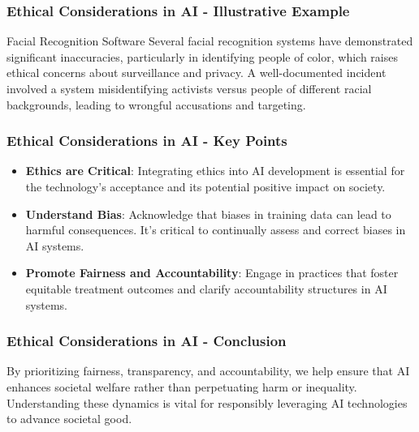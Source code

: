 \documentclass[aspectratio=169]{beamer}
\begin{document}
\begin{frame}[fragile]
    \frametitle{Ethical Considerations in AI - Illustrative Example}
    \begin{block}{Facial Recognition Software}
        Several facial recognition systems have demonstrated significant inaccuracies, particularly in identifying people of color, which raises ethical concerns about surveillance and privacy. 
        A well-documented incident involved a system misidentifying activists versus people of different racial backgrounds, leading to wrongful accusations and targeting.
    \end{block}
\end{frame}

\begin{frame}[fragile]
    \frametitle{Ethical Considerations in AI - Key Points}
    \begin{itemize}
        \item \textbf{Ethics are Critical}: Integrating ethics into AI development is essential for the technology's acceptance and its potential positive impact on society.
        \item \textbf{Understand Bias}: Acknowledge that biases in training data can lead to harmful consequences. It's critical to continually assess and correct biases in AI systems.
        \item \textbf{Promote Fairness and Accountability}: Engage in practices that foster equitable treatment outcomes and clarify accountability structures in AI systems.
    \end{itemize}
\end{frame}

\begin{frame}[fragile]
    \frametitle{Ethical Considerations in AI - Conclusion}
    By prioritizing fairness, transparency, and accountability, we help ensure that AI enhances societal welfare rather than perpetuating harm or inequality. 
    Understanding these dynamics is vital for responsibly leveraging AI technologies to advance societal good.
\end{frame}
\end{document}
